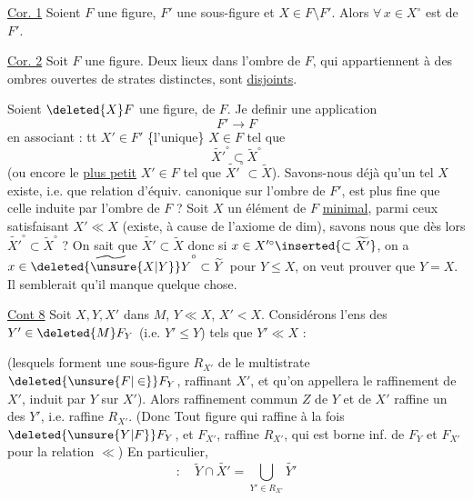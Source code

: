 \uline{Cor. 1} Soient $F$ une figure, $F'$ une sous-figure et $X\in F\setminus F'$. Alors $\forall\,x\in X^\circ$ est   de $F'$.

\uline{Cor. 2} Soit $F$ une figure. Deux lieux dans  l'ombre de $F$, qui appartiennent à des ombres ouvertes de strates distinctes, sont \uline{disjoints}.

Soient $\deleted{X}F$ une figure,   de $F$. Je  definir une application
\[
 F'\longrightarrow F
\]
en associant : tt $X'\in F'$ \{l'unique\} $X\in F$ tel que
\[
 \widetilde{X'}^\circ\subset\widetilde X^\circ
\]
(ou encore le \uline{plus petit}  $X'\in F$ tel que $\widetilde{X'}^\circ\subset\widetilde X$). Savons-nous déjà qu'un tel $X$ existe, i.e. que  relation d'équiv. canonique sur l'ombre de $F'$, est plus fine que celle induite par l'ombre de $F$ ? Soit $X$ un élément de $F$ \uline{minimal}, parmi ceux satisfaisant $X'\ll X$ (existe, à cause de l'axiome de dim), savons nous que dès lors $\widetilde{X'}^\circ\subset\widetilde X^\circ$ ?  On sait que $\widetilde{X'}\subset\widetilde X$ donc si $x\in X'^\circ\inserted{\subset\widetilde{X'}}$, on a $x\in\widetilde{\deleted{\unsure{X|Y}}Y}^\circ\subset\widetilde Y$ pour $Y\leq X$, on veut prouver que $Y=X$. Il semblerait qu'il manque quelque chose.

\uline{Cont 8} Soit $X,Y,X'$ dans $M$, $Y\ll X$, $X'<X$. Considérons l'ens des $Y'\in\deleted{ M}F_Y$ (i.e. $Y'\leq Y$) tels que $Y'\ll X$ :

(lesquels forment une sous-figure $R_{X'}$ de le multistrate $\deleted{\unsure{F|\in}}F_Y$,  raffinant $X'$, et qu'on appellera le raffinement de $X'$, induit par $Y$ sur $X'$). Alors  raffinement commun $Z$ de $Y$ et de $X'$ raffine un des $Y'$, i.e. raffine $R_{X'}$. (Donc Tout figure qui raffine à la fois $\deleted{\unsure{Y|F}}F_Y$, et $F_{X'}$, raffine $R_{X'}$, qui est  borne inf. de $F_Y$ et $F_{X'}$ pour la relation $\ll$) En particulier,
\[
 :\quad \widetilde Y\cap\widetilde{X'}=\bigcup_{Y'\in R_{X'}}\widetilde{Y'}
\]

